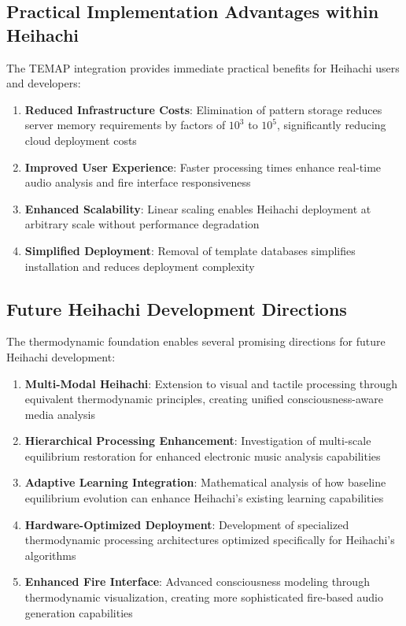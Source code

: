 \documentclass[12pt,a4paper]{article}
\begin{document}
\subsection{Practical Implementation Advantages within Heihachi}

The TEMAP integration provides immediate practical benefits for Heihachi users and developers:

\begin{enumerate}
\item \textbf{Reduced Infrastructure Costs}: Elimination of pattern storage reduces server memory requirements by factors of $10^3$ to $10^5$, significantly reducing cloud deployment costs
\item \textbf{Improved User Experience}: Faster processing times enhance real-time audio analysis and fire interface responsiveness
\item \textbf{Enhanced Scalability}: Linear scaling enables Heihachi deployment at arbitrary scale without performance degradation
\item \textbf{Simplified Deployment}: Removal of template databases simplifies installation and reduces deployment complexity
\end{enumerate}

\subsection{Future Heihachi Development Directions}

The thermodynamic foundation enables several promising directions for future Heihachi development:

\begin{enumerate}
\item \textbf{Multi-Modal Heihachi}: Extension to visual and tactile processing through equivalent thermodynamic principles, creating unified consciousness-aware media analysis
\item \textbf{Hierarchical Processing Enhancement}: Investigation of multi-scale equilibrium restoration for enhanced electronic music analysis capabilities
\item \textbf{Adaptive Learning Integration}: Mathematical analysis of how baseline equilibrium evolution can enhance Heihachi's existing learning capabilities
\item \textbf{Hardware-Optimized Deployment}: Development of specialized thermodynamic processing architectures optimized specifically for Heihachi's algorithms
\item \textbf{Enhanced Fire Interface}: Advanced consciousness modeling through thermodynamic visualization, creating more sophisticated fire-based audio generation capabilities
\end{enumerate}
\end{document}
